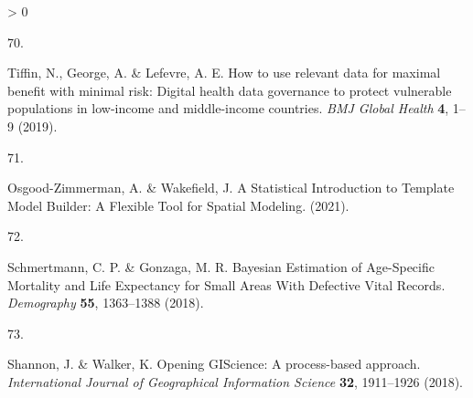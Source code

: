 \documentclass[
]{article}
\newlength{\cslhangindent}
\newlength{\csllabelwidth}
\newenvironment{CSLReferences}[2] %
 {%
  \setlength{\parindent}{0pt}
  \ifodd #1 \everypar{\setlength{\hangindent}{\cslhangindent}}\ignorespaces\fi
  \ifnum #2 > 0
  \setlength{\parskip}{#2\baselineskip}
  \fi
 }%
 {}
\newcommand{\CSLLeftMargin}[1]{\parbox[t]{\csllabelwidth}{#1}}
\newcommand{\CSLRightInline}[1]{\parbox[t]{\linewidth - \csllabelwidth}{#1}\break}
\begin{document}
\begin{CSLReferences}{0}{0}
\leavevmode\hypertarget{ref-Tiffin2019}{}%
\CSLLeftMargin{70. }
\CSLRightInline{Tiffin, N., George, A. \& Lefevre, A. E. {How to use relevant data for maximal benefit with minimal risk: Digital health data governance to protect vulnerable populations in low-income and middle-income countries}. \emph{BMJ Global Health} \textbf{4}, 1--9 (2019).}

\leavevmode\hypertarget{ref-Osgood-Zimmerman2021}{}%
\CSLLeftMargin{71. }
\CSLRightInline{Osgood-Zimmerman, A. \& Wakefield, J. {A Statistical Introduction to Template Model Builder: A Flexible Tool for Spatial Modeling}. (2021).}

\leavevmode\hypertarget{ref-Schmertmann2018}{}%
\CSLLeftMargin{72. }
\CSLRightInline{Schmertmann, C. P. \& Gonzaga, M. R. {Bayesian Estimation of Age-Specific Mortality and Life Expectancy for Small Areas With Defective Vital Records}. \emph{Demography} \textbf{55}, 1363--1388 (2018).}

\leavevmode\hypertarget{ref-Shannon2018}{}%
\CSLLeftMargin{73. }
\CSLRightInline{Shannon, J. \& Walker, K. {Opening GIScience: A process-based approach}. \emph{International Journal of Geographical Information Science} \textbf{32}, 1911--1926 (2018).}

\end{CSLReferences}
\end{document}
